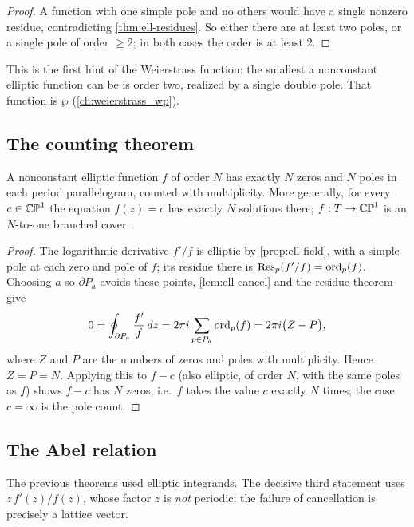 \begin{proof}
A function with one simple pole and no others would have a single nonzero
residue, contradicting \cref{thm:ell-residues}. So either there are at least two
poles, or a single pole of order \(\ge 2\); in both cases the order is at least
\(2\).
\end{proof}

This is the first hint of the Weierstrass function: the smallest a nonconstant
elliptic function can be is order two, realized by a single double pole. That
function is \(\wp\) (\cref{ch:weierstrass_wp}).

\subsection{The counting theorem}

\begin{theorem}
\label{thm:ell-valence}
A nonconstant elliptic function \(f\) of order \(N\) has exactly \(N\) zeros and
\(N\) poles in each period parallelogram, counted with multiplicity. More
generally, for every \(c \in \mathbb{CP}^1\) the equation \(f(z) = c\) has exactly \(N\)
solutions there; \(f : T \to \mathbb{CP}^1\) is an \(N\)-to-one branched cover.
\end{theorem}

\begin{proof}
The logarithmic derivative \(f'/f\) is elliptic by \cref{prop:ell-field}, with a
simple pole at each zero and pole of \(f\); its residue there is
\(\operatorname{Res}_p(f'/f) = \operatorname{ord}_p(f)\). Choosing \(a\) so \(\partial P_a\) avoids these
points, \cref{lem:ell-cancel} and the residue theorem give
\[
  0 = \oint_{\partial P_a} \frac{f'}{f}\,dz
  = 2\pi i \sum_{p \in P_a} \operatorname{ord}_p(f)
  = 2\pi i \bigl( Z - P \bigr),
\]
where \(Z\) and \(P\) are the numbers of zeros and poles with multiplicity.
Hence \(Z = P = N\). Applying this to \(f - c\) (also elliptic, of order \(N\),
with the same poles as \(f\)) shows \(f - c\) has \(N\) zeros, i.e.\ \(f\) takes
the value \(c\) exactly \(N\) times; the case \(c = \infty\) is the pole count.
\end{proof}

\subsection{The Abel relation}

The previous theorems used elliptic integrands. The decisive third statement
uses \(z\,f'(z)/f(z)\), whose factor \(z\) is \emph{not} periodic; the failure of
cancellation is precisely a lattice vector.


